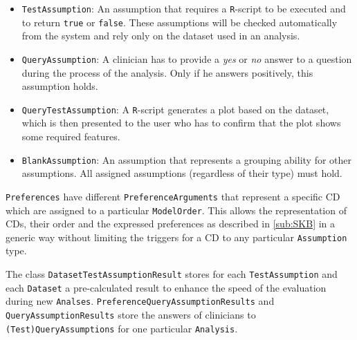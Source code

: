 \bigskip

\begin{itemize}

	\item \texttt{TestAssumption}: An assumption that requires a \texttt{R}-script to be executed and to return \texttt{true} or \texttt{false}. These assumptions will be checked automatically from the system and rely only on the dataset used in an analysis.
	\item \texttt{QueryAssumption}: A clinician has to provide a \textit{yes} or \textit{no} answer to a question during the process of the analysis. Only if he answers positively, this assumption holds.
	\item \texttt{QueryTestAssumption}: A \texttt{R}-script generates a plot based on the dataset, which is then presented to the user who has to confirm that the plot shows some required features.
	\item \texttt{BlankAssumption}: An assumption that represents a grouping ability for other assumptions. All assigned assumptions (regardless of their type) must hold. 
\end{itemize}
\bigskip


\texttt{Preferences} have different \texttt{PreferenceArguments} that represent a specific \gls{CD} which are assigned to a particular \texttt{ModelOrder}. This allows the representation of \glspl{CD}, their order and the expressed preferences as described in \autoref{sub:SKB} in a generic way without limiting the triggers for a \gls{CD} to any particular \texttt{Assumption} type. 

The class \texttt{DatasetTestAssumptionResult} stores for each \texttt{TestAssumption} and each \texttt{Dataset} a pre-calculated result to enhance the speed of the evaluation during new \texttt{Analses}. \texttt{PreferenceQueryAssumptionResults} and \texttt{QueryAssumptionResults} store the answers of clinicians to \texttt{(Test)QueryAssumptions} for one particular \texttt{Analysis}.
